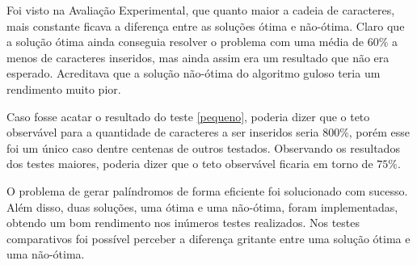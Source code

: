 \documentclass[12pt]{article}
\begin{document}
    Foi visto na Avaliação Experimental, que quanto maior a cadeia de caracteres, mais constante ficava a diferença entre as soluções ótima e não-ótima. Claro que a solução ótima ainda conseguia resolver o problema com uma média de $60\%$ a menos de caracteres inseridos, mas ainda assim era um resultado que não era esperado. Acreditava que a solução não-ótima do algoritmo guloso teria um rendimento muito pior.

    Caso fosse acatar o resultado do teste \ref{pequeno}, poderia dizer que o teto observável para a quantidade de caracteres a ser inseridos seria $800\%$, porém esse foi um único caso dentre centenas de outros testados. Observando os resultados dos testes maiores, poderia dizer que o teto observável ficaria em torno de $75\%$.

    O problema de gerar palíndromos de forma eficiente foi solucionado com sucesso. Além disso, duas soluções, uma ótima e uma não-ótima, foram implementadas, obtendo um bom rendimento nos inúmeros testes realizados. Nos testes comparativos foi possível perceber a diferença gritante entre uma solução ótima e uma não-ótima.



\end{document}
